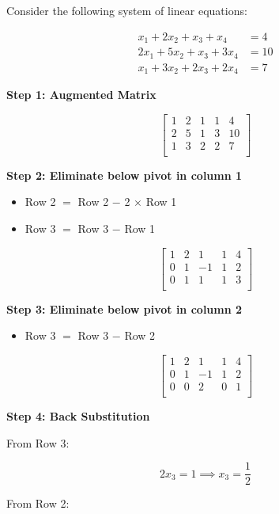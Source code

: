 Consider the following system of linear equations:

\begin{align*}
    x_1 + 2x_2 + x_3 + x_4   & = 4  \\
    2x_1 + 5x_2 + x_3 + 3x_4 & = 10 \\
    x_1 + 3x_2 + 2x_3 + 2x_4 & = 7
\end{align*}

\textbf{Step 1: Augmented Matrix}

\[
    \begin{bmatrix}
        1 & 2 & 1 & 1 & 4  \\
        2 & 5 & 1 & 3 & 10 \\
        1 & 3 & 2 & 2 & 7  \\
    \end{bmatrix}
\]

\textbf{Step 2: Eliminate below pivot in column 1}

\begin{itemize}
    \item Row 2 \(=\) Row 2 \(-\) 2 \(\times\) Row 1
    \item Row 3 \(=\) Row 3 \(-\) Row 1
\end{itemize}

\[
    \begin{bmatrix}
        1 & 2 & 1  & 1 & 4 \\
        0 & 1 & -1 & 1 & 2 \\
        0 & 1 & 1  & 1 & 3 \\
    \end{bmatrix}
\]

\textbf{Step 3: Eliminate below pivot in column 2}

\begin{itemize}
    \item Row 3 \(=\) Row 3 \(-\) Row 2
\end{itemize}

\[
    \begin{bmatrix}
        1 & 2 & 1  & 1 & 4 \\
        0 & 1 & -1 & 1 & 2 \\
        0 & 0 & 2  & 0 & 1 \\
    \end{bmatrix}
\]

\textbf{Step 4: Back Substitution}

From Row 3:

\[
    2x_3 = 1 \implies x_3 = \frac{1}{2}
\]

From Row 2:

